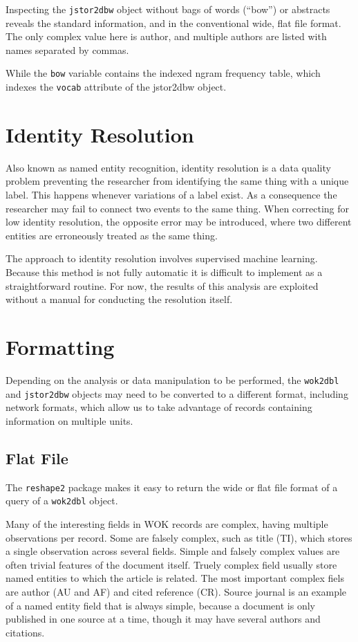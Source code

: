 \documentclass [PhD] {uclathes}
\begin{document}
Inspecting the \texttt{jstor2dbw} object without bags of words (``bow'')
or abstracts reveals the standard information, and in the conventional
wide, flat file format. The only complex value here is author, and
multiple authors are listed with names separated by commas.

While the \texttt{bow} variable contains the indexed ngram frequency
table, which indexes the \texttt{vocab} attribute of the jstor2dbw
object.

\section{Identity Resolution}\label{identity-resolution}

Also known as named entity recognition, identity resolution is a data
quality problem preventing the researcher from identifying the same
thing with a unique label. This happens whenever variations of a label
exist. As a consequence the researcher may fail to connect two events to
the same thing. When correcting for low identity resolution, the
opposite error may be introduced, where two different entities are
erroneously treated as the same thing.

The approach to identity resolution involves supervised machine
learning. Because this method is not fully automatic it is difficult to
implement as a straightforward routine. For now, the results of this
analysis are exploited without a manual for conducting the resolution
itself.

\section{Formatting}\label{formatting}

Depending on the analysis or data manipulation to be performed, the
\texttt{wok2dbl} and \texttt{jstor2dbw} objects may need to be converted
to a different format, including network formats, which allow us to take
advantage of records containing information on multiple units.

\subsection{Flat File}\label{flat-file}

The \texttt{reshape2} package makes it easy to return the wide or flat
file format of a query of a \texttt{wok2dbl} object.

Many of the interesting fields in WOK records are complex, having
multiple observations per record. Some are falsely complex, such as
title (TI), which stores a single observation across several fields.
Simple and falsely complex values are often trivial features of the
document itself. Truely complex field usually store named entities to
which the article is related. The most important complex fiels are
author (AU and AF) and cited reference (CR). Source journal is an
example of a named entity field that is always simple, because a
document is only published in one source at a time, though it may have
several authors and citations.
\end{document}
